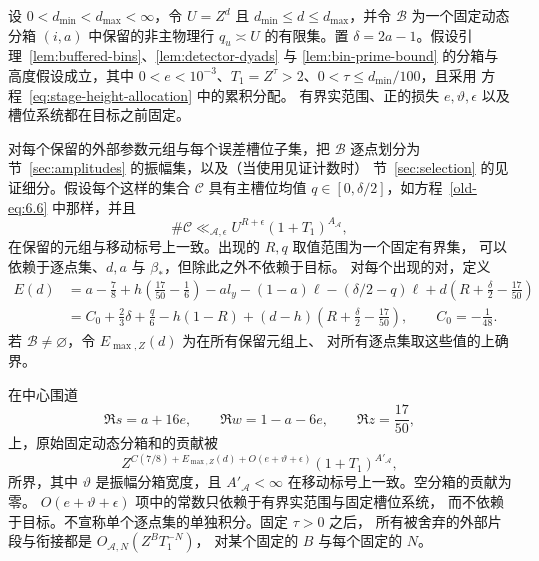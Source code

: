 \begin{lemma}[单个行分箱的一个高指数]\label{lem:high-bin}
设 \(0<d_{\min}<d_{\max}<\infty\)，令 \(U=Z^d\) 且
\(d_{\min}\le d\le d_{\max}\)，并令
\(\mathcal B\) 为一个固定动态分箱 \((i,a)\) 中保留的非主物理行
\(q_u\asymp U\) 的有限集。置
\(\delta=2a-1\)。假设引理~\ref{lem:buffered-bins}、\ref{lem:detector-dyads}
与 \ref{lem:bin-prime-bound} 的分箱与高度假设成立，其中
\(0<e<10^{-3}\)、\(T_1=Z^\tau>2\)、\(0<\tau\le d_{\min}/100\)，且采用
方程~\eqref{eq:stage-height-allocation} 中的累积分配。
有界实范围、正的损失 \(e,\vartheta,\epsilon\) 以及槽位系统都在目标之前固定。

对每个保留的外部参数元组与每个误差槽位子集，把 \(\mathcal B\)
逐点划分为节~\ref{sec:amplitudes} 的振幅集，以及（当使用见证计数时）
节~\ref{sec:selection} 的见证细分。假设每个这样的集合 \(\mathcal C\)
具有主槽位均值 \(q\in[0,\delta/2]\)，如方程~\eqref{old-eq:6.6} 中那样，并且
\[
 \#\mathcal C\ll_{\mathcal A,\epsilon}
 U^{R+\epsilon}(1+T_1)^{A_{\mathcal A}},
\]
在保留的元组与移动标号上一致。出现的 \(R,q\) 取值范围为一个固定有界集，
可以依赖于逐点集、\(d,a\) 与 \(\beta_*\)，但除此之外不依赖于目标。
对每个出现的对，定义
\begin{equation}\label{eq:common-high-exponent}
 \begin{split}
 E(d)
 &=a-\frac78+h\left(\frac{17}{50}-\frac16\right)
       -a l_y-(1-a)\ell-(\delta/2-q)\ell
       +d\left(R+\frac\delta2-\frac{17}{50}\right)\\
 &=C_0+\frac23\delta+\frac q6-h(1-R)
       +(d-h)\left(R+\frac\delta2-\frac{17}{50}\right),
       \qquad C_0=-\frac1{48}.
 \end{split}
\end{equation}
若 \(\mathcal B\ne\varnothing\)，令 \(E_{\max,Z}(d)\) 为在所有保留元组上、
对所有逐点集取这些值的上确界。

在中心围道
\[
 \Re s=a+16e,\qquad \Re w=1-a-6e,\qquad \Re z=\frac{17}{50},
\]
上，原始固定动态分箱和的贡献被
\[
 Z^{C(7/8)+E_{\max,Z}(d)+O(e+\vartheta+\epsilon)}
 (1+T_1)^{A'_{\mathcal A}},
\]
所界，其中 \(\vartheta\) 是振幅分箱宽度，且
\(A'_{\mathcal A}<\infty\) 在移动标号上一致。空分箱的贡献为零。
\(O(e+\vartheta+\epsilon)\) 项中的常数只依赖于有界实范围与固定槽位系统，
而不依赖于目标。不宣称单个逐点集的单独积分。固定 \(\tau>0\) 之后，
所有被舍弃的外部片段与衔接都是 \(O_{\mathcal A,N}(Z^B T_1^{-N})\)，
对某个固定的 \(B\) 与每个固定的 \(N\)。
\end{lemma}

